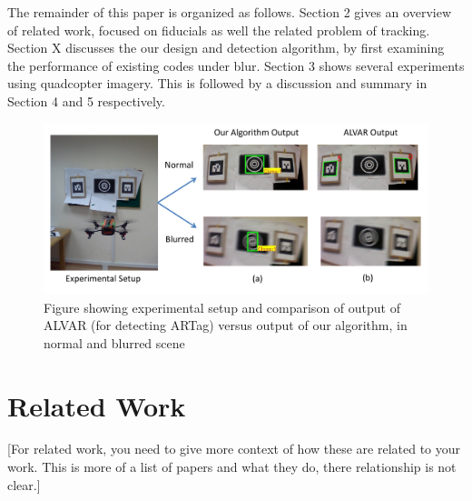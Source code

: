 \documentclass[runningheads]{llncs}
\begin{document}
The remainder of this paper is organized as follows.   Section 2 gives an
overview of related work, focused on fiducials as well the related problem of
tracking.  Section X discusses the our design and detection algorithm, by first
examining the performance of existing codes under blur. Section 3 shows several
experiments using quadcopter imagery.  This is followed by a discussion and
summary in Section 4 and 5 respectively.

\begin{figure}
\includegraphics[width=\linewidth]{teaser.pdf}
\caption{Figure showing experimental setup and comparison of
output of ALVAR\cite{alvar} (for detecting ARTag) versus output of our
algorithm, in normal and blurred scene}
\label{fig:teaser}
\end{figure}

\section{Related Work}

[For related work, you need to give more context of how these are related to your work. 
This is more of a list of papers and what they do, there relationship is not clear.]
\end{document}
